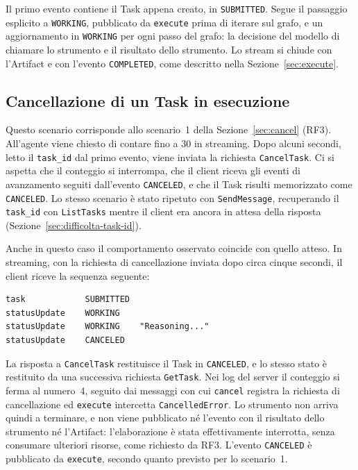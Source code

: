 Il primo evento contiene il Task appena creato, in \texttt{SUBMITTED}. Segue il passaggio esplicito a \texttt{WORKING}, pubblicato da \texttt{execute} prima di iterare sul grafo, e un aggiornamento in \texttt{WORKING} per ogni passo del grafo: la decisione del modello di chiamare lo strumento e il risultato dello strumento. Lo stream si chiude con l'Artifact e con l'evento \texttt{COMPLETED}, come descritto nella Sezione~\ref{sec:execute}.

\subsection{Cancellazione di un Task in esecuzione}

Questo scenario corrisponde allo scenario~1 della Sezione~\ref{sec:cancel} (RF3). All'agente viene chiesto di contare fino a 30 in streaming. Dopo alcuni secondi, letto il \texttt{task\_id} dal primo evento, viene inviata la richiesta \texttt{CancelTask}. Ci si aspetta che il conteggio si interrompa, che il client riceva gli eventi di avanzamento seguiti dall'evento \texttt{CANCELED}, e che il Task risulti memorizzato come \texttt{CANCELED}. Lo stesso scenario è stato ripetuto con \texttt{SendMessage}, recuperando il \texttt{task\_id} con \texttt{ListTasks} mentre il client era ancora in attesa della risposta (Sezione~\ref{sec:difficolta-task-id}).

Anche in questo caso il comportamento osservato coincide con quello atteso. In streaming, con la richiesta di cancellazione inviata dopo circa cinque secondi, il client riceve la sequenza seguente:

\begin{center}
\begin{minipage}{0.95\linewidth}
\footnotesize
\begin{verbatim}
task            SUBMITTED
statusUpdate    WORKING
statusUpdate    WORKING    "Reasoning..."
statusUpdate    CANCELED
\end{verbatim}
\end{minipage}
\end{center}

La risposta a \texttt{CancelTask} restituisce il Task in \texttt{CANCELED}, e lo stesso stato è restituito da una successiva richiesta \texttt{GetTask}. Nei log del server il conteggio si ferma al numero~4, seguito dai messaggi con cui \texttt{cancel} registra la richiesta di cancellazione ed \texttt{execute} intercetta \texttt{CancelledError}. Lo strumento non arriva quindi a terminare, e non viene pubblicato né l'evento con il risultato dello strumento né l'Artifact: l'elaborazione è stata effettivamente interrotta, senza consumare ulteriori risorse, come richiesto da RF3. L'evento \texttt{CANCELED} è pubblicato da \texttt{execute}, secondo quanto previsto per lo scenario~1.

